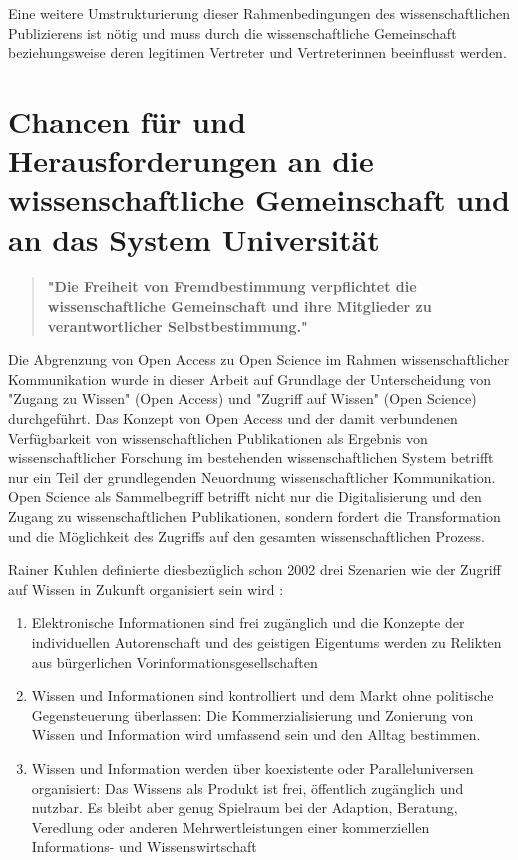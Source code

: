 Eine weitere Umstrukturierung dieser Rahmenbedingungen des wissenschaftlichen Publizierens ist nötig \cite{naeder_2010_open} und muss durch die wissenschaftliche Gemeinschaft beziehungsweise deren legitimen Vertreter und Vertreterinnen beeinflusst werden.

\section{Chancen für und Herausforderungen an die wissenschaftliche Gemeinschaft und an das System Universität}

\begin{quote}
\textbf{"Die Freiheit von Fremdbestimmung verpflichtet die wissenschaftliche Gemeinschaft und ihre Mitglieder zu verantwortlicher Selbstbestimmung."}
\end{quote} \cite{Oezmen_2015}

Die Abgrenzung von Open Access zu Open Science im Rahmen wissenschaftlicher Kommunikation wurde in dieser Arbeit auf Grundlage der Unterscheidung von "Zugang zu Wissen" (Open Access) und "Zugriff auf Wissen" (Open Science) durchgeführt. Das Konzept von Open Access und der damit verbundenen Verfügbarkeit von wissenschaftlichen Publikationen als Ergebnis von wissenschaftlicher Forschung im bestehenden wissenschaftlichen System betrifft nur ein Teil der grundlegenden Neuordnung wissenschaftlicher Kommunikation. Open Science als Sammelbegriff betrifft nicht nur die Digitalisierung und den Zugang zu wissenschaftlichen Publikationen, sondern fordert die Transformation und die Möglichkeit des Zugriffs auf den gesamten wissenschaftlichen Prozess.

Rainer Kuhlen definierte diesbezüglich schon 2002 drei Szenarien wie der Zugriff auf Wissen in Zukunft organisiert sein wird \cite{Kuhlen_2002_universalaccess}:
\begin{enumerate}
\item Elektronische Informationen sind frei zugänglich und die Konzepte der individuellen Autorenschaft und des geistigen Eigentums werden zu Relikten aus bürgerlichen Vorinformationsgesellschaften
\item Wissen und Informationen sind kontrolliert und dem Markt ohne politische Gegensteuerung überlassen: Die Kommerzialisierung und Zonierung von Wissen und Information wird umfassend sein und den Alltag bestimmen.
\item Wissen und Information werden über koexistente oder Paralleluniversen organisiert: Das Wissens als Produkt ist frei, öffentlich zugänglich und nutzbar. Es bleibt aber genug Spielraum bei der Adaption, Beratung, Veredlung oder anderen Mehrwertleistungen einer kommerziellen Informations- und Wissenswirtschaft
\end{enumerate}

